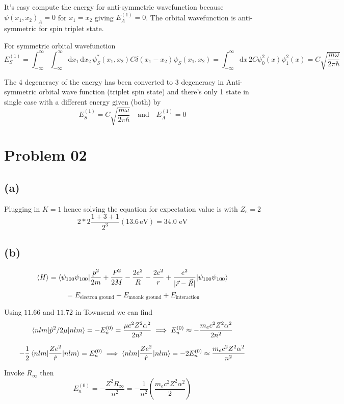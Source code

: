 \documentclass[letter, 10pts]{article}
\newcommand{\hb}{\hbar}
\begin{document}
It's easy compute the energy for anti-symmetric wavefunction because $\psi(x_1, x_2)_A = 0$ for $x_1 = x_2$ giving $E_A ^{(1) } = 0$. The orbital wavefunction is anti-symmetric for spin triplet state. 

For symmetric orbital wavefunction 
\[
E_S ^{(1)} = 
\int_{-\infty}^{\infty}  
\int_{-\infty}^{\infty}  
\mathrm{d} x_1 \, \mathrm{d} x_2 \, 
\psi_S^{*} (x_1 ,x_2) C \delta(x_1  - x_2) \psi_S(x_1 , x_2) = \int_{-\infty}^{\infty}  \mathrm{d}  x \, 2 C \psi_0 ^2 (x) \psi_1 ^2 (x) = C \sqrt{\frac{m \omega }{2 \pi \hb}} 
\] 


The 4 degeneracy of the energy has been converted to 3 degeneracy in Anti-symmetric orbital wave function (triplet spin state) and there's only 1 state in single case with a different energy given (both) by
\[
\boxed{
E_S ^{(1)} = C \sqrt{\frac{m \omega}{2 \pi \hb}}  \quad \text{and} \quad E_A ^{(1)} = 0
}
\] 
\section*{Problem 02}
\subsection*{(a)}
Plugging in $K = 1$ 
hence solving the equation for expectation 
value is with $Z_e = 2 $
\[
2 * 2 \frac{1 + 3 + 1}{2^3	 }  (13.6 \, \text{eV}) = 34.0 \text{ eV}
\] 

\subsection*{(b)} 
\[
	\braket{H } = 
	\braket{\psi_{100} \psi_{100}  | \frac{p^2}{2m} + \frac{P^2}{2 M} - 
	\frac{2 e^2}{R} - \frac{2 e^2}{r} + \frac{e^2}{|\vec{r} - \vec{R}| } | \psi_{100} \psi_{100} }
\] 
\[
= E_\text{electron ground} + E_\text{muonic ground} + E_\text{interaction}
\]

Using $11.66$ and $11.72 $ in Townsend we can find 
\[
\braket{nlm | { \hat{p}^2/2 \mu }| nlm} = - E_n ^{(0)} = \frac{\mu c^2 Z^2 \alpha^2}{2 n^2} 
\implies 
E_n ^{(0)}\approx
 - \frac{m_e c^2 Z^2 \alpha ^2}{2 n ^2}
\] 

\[
- \frac{1}{2} \braket{nlm | \frac{ Z e^2 }{\hat{r}} | n l m} =  E_n^{(0)} \implies 
\braket{nlm | \frac{ Z e^2 }{\hat{r}} | n l m} =  -2 E_n ^{(0)} \approx  \frac{m_e c^2 Z^2 \alpha ^2 }{n^2 }
\] 

Invoke $R_\infty$ then 
\[
E_n^{(0)} = - \frac{Z ^2 R_\infty}{n^2} = - \frac{1}{n^2} \left(
\frac{m_e c^2 Z^2 \alpha ^2}{ 2}
\right)
\] 
\end{document}
